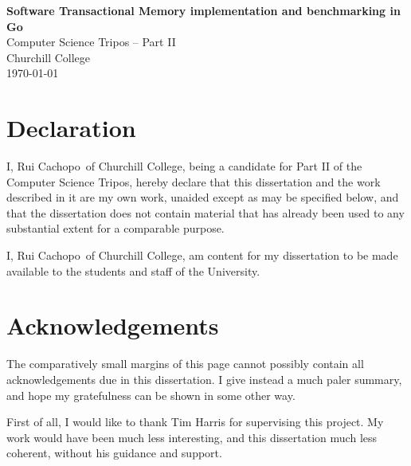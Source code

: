 \documentclass[12pt,a4paper,oneside,openright]{report}
\newcommand{\disstitle}{Software Transactional Memory implementation
  and benchmarking in Go}
\newcommand{\college}{Churchill College}
\newcommand{\studentname}{Rui Cachopo}
\begin{document}


\pagestyle{empty}


\rightline{\LARGE \textbf{\studentname}}

\vspace*{60mm}
\begin{center}
  \Huge
  \textbf{\disstitle} \\[5mm]
  Computer Science Tripos -- Part II \\[5mm]
  \college \\[5mm]
  \today
\end{center}

\newpage

\section*{Declaration}

I, \studentname\ of \college, being a candidate for Part II of the
Computer Science Tripos, hereby declare that this dissertation and the
work described in it are my own work, unaided except as may be
specified below, and that the dissertation does not contain material
that has already been used to any substantial extent for a comparable
purpose.

I, \studentname\ of \college, am content for my dissertation to be
made available to the students and staff of the University.

\bigskip {}

\medskip {}

\newpage

\section*{Acknowledgements}

The comparatively small margins of this page cannot possibly contain
all acknowledgements due in this dissertation. I give instead a much
paler summary, and hope my gratefulness can be shown in some other
way.

\medskip

First of all, I would like to thank Tim Harris for supervising this
project. My work would have been much less interesting, and this
dissertation much less coherent, without his guidance and support.

\medskip
\end{document}
